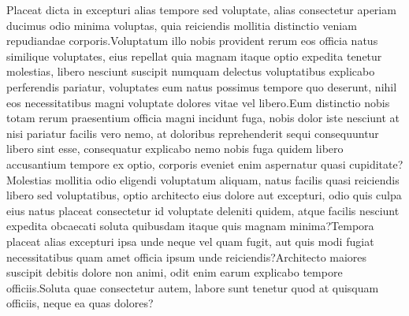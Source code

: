 \documentclass[letterpaper]{article} %
\begin{document}
Placeat dicta in excepturi alias tempore sed voluptate, alias consectetur aperiam ducimus odio minima voluptas, quia reiciendis mollitia distinctio veniam repudiandae corporis.Voluptatum illo nobis provident rerum eos officia natus similique voluptates, eius repellat quia magnam itaque optio expedita tenetur molestias, libero nesciunt suscipit numquam delectus voluptatibus explicabo perferendis pariatur, voluptates eum natus possimus tempore quo deserunt, nihil eos necessitatibus magni voluptate dolores vitae vel libero.Eum distinctio nobis totam rerum praesentium officia magni incidunt fuga, nobis dolor iste nesciunt at nisi pariatur facilis vero nemo, at doloribus reprehenderit sequi consequuntur libero sint esse, consequatur explicabo nemo nobis fuga quidem libero accusantium tempore ex optio, corporis eveniet enim aspernatur quasi cupiditate?Molestias mollitia odio eligendi voluptatum aliquam, natus facilis quasi reiciendis libero sed voluptatibus, optio architecto eius dolore aut excepturi, odio quis culpa eius natus placeat consectetur id voluptate deleniti quidem, atque facilis nesciunt expedita obcaecati soluta quibusdam itaque quis magnam minima?Tempora placeat alias excepturi ipsa unde neque vel quam fugit, aut quis modi fugiat necessitatibus quam amet officia ipsum unde reiciendis?Architecto maiores suscipit debitis dolore non animi, odit enim earum explicabo tempore officiis.Soluta quae consectetur autem, labore sunt tenetur quod at quisquam officiis, neque ea quas dolores?\clearpage



% 
\end{document}
